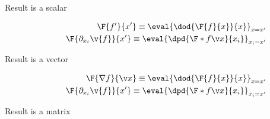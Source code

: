 \begin{description}
  \item[Result is a scalar]
\begin{align*}
	\F{f'}{x'} \equiv \eval{\dod{\F{f}{x}}{x}}_{x=x'}\\
	\F{\partial_{x_i}\v{f}}{x'} \equiv \eval{\dpd{\F*{f}{\x}}{x_i}}_{x_i=x'}\\
\end{align*}
  \item[Result is a vector]
\begin{align*}
	\F{\nabla f}{\x} \equiv \eval{\dod{\F{f}{x}}{x}}_{x=x'}\\
	\F{\partial_{x_i}\v{f}}{x'} \equiv \eval{\dpd{\F*{f}{\x}}{x_i}}_{x_i=x'}\\
\end{align*}   
   
   \item[Result is a matrix]
\end{description}





